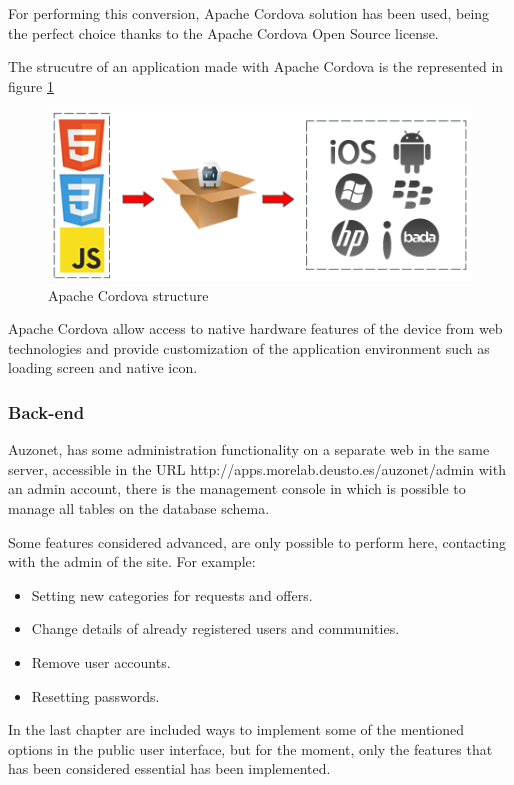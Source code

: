 \documentclass{DeustoFDP}
\begin{document}
For performing this conversion, Apache Cordova solution has been used, being the perfect choice thanks to the Apache Cordova Open Source license.

The strucutre of an application made with Apache Cordova is the represented in figure \ref{fig:cordova_workflow}

\begin{figure}[h]
\centering
\includegraphics[width=0.7\linewidth]{fig/cordova_workflow}
\caption[Apache Cordova structure]{Apache Cordova structure}
\label{fig:cordova_workflow}
\end{figure}

Apache Cordova allow access to native hardware features of the device from web technologies and provide customization of the application environment such as loading screen and native icon.
\newpage
\subsubsection{Back-end}
Auzonet, has some administration functionality on a separate web in the same server, accessible in the URL http://apps.morelab.deusto.es/auzonet/admin with an admin account, there is the management console in which is possible to manage all tables on the database schema.

Some features considered advanced, are only possible to perform here, contacting with the admin of the site. For example:

\begin{itemize}
	\item Setting new categories for requests and offers.
	\item Change details of already registered users and communities.
	\item Remove user accounts.
	\item Resetting passwords.
\end{itemize}

In the last chapter are included ways to implement some of the mentioned options in the public user interface, but for the moment, only the features that has been considered essential has been implemented.
\newpage
\end{document}
